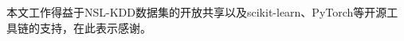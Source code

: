 \documentclass{cjc}
\begin{document}
\maketitle








\begin{acknowledgments}
  本文工作得益于NSL-KDD数据集的开放共享以及scikit-learn、PyTorch等开源工具链的支持，在此表示感谢。
\end{acknowledgments}








\newpage
\appendix

\end{document}

